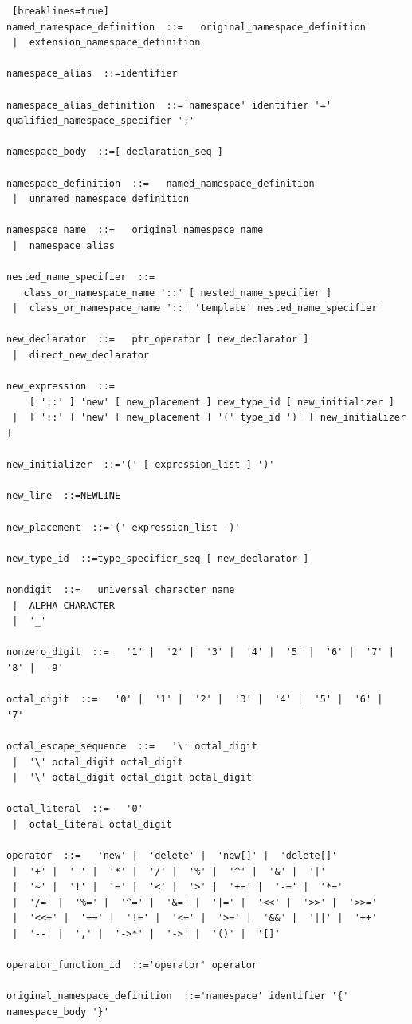 \documentclass[11pt]{book}
\begin{document}
\begin{lstlisting} [breaklines=true]
named_namespace_definition  ::=   original_namespace_definition
 |  extension_namespace_definition

namespace_alias  ::=identifier

namespace_alias_definition  ::='namespace' identifier '=' qualified_namespace_specifier ';'

namespace_body  ::=[ declaration_seq ]

namespace_definition  ::=   named_namespace_definition
 |  unnamed_namespace_definition

namespace_name  ::=   original_namespace_name
 |  namespace_alias

nested_name_specifier  ::=
   class_or_namespace_name '::' [ nested_name_specifier ]
 |  class_or_namespace_name '::' 'template' nested_name_specifier

new_declarator  ::=   ptr_operator [ new_declarator ]
 |  direct_new_declarator

new_expression  ::=
    [ '::' ] 'new' [ new_placement ] new_type_id [ new_initializer ]
 |  [ '::' ] 'new' [ new_placement ] '(' type_id ')' [ new_initializer ]

new_initializer  ::='(' [ expression_list ] ')'

new_line  ::=NEWLINE

new_placement  ::='(' expression_list ')'

new_type_id  ::=type_specifier_seq [ new_declarator ]

nondigit  ::=   universal_character_name
 |  ALPHA_CHARACTER
 |  '_'

nonzero_digit  ::=   '1' |  '2' |  '3' |  '4' |  '5' |  '6' |  '7' |  '8' |  '9'

octal_digit  ::=   '0' |  '1' |  '2' |  '3' |  '4' |  '5' |  '6' |  '7'
   
octal_escape_sequence  ::=   '\' octal_digit
 |  '\' octal_digit octal_digit
 |  '\' octal_digit octal_digit octal_digit

octal_literal  ::=   '0'
 |  octal_literal octal_digit

operator  ::=   'new' |  'delete' |  'new[]' |  'delete[]'
 |  '+' |  '-' |  '*' |  '/' |  '%' |  '^' |  '&' |  '|'
 |  '~' |  '!' |  '=' |  '<' |  '>' |  '+=' |  '-=' |  '*='
 |  '/=' |  '%=' |  '^=' |  '&=' |  '|=' |  '<<' |  '>>' |  '>>='
 |  '<<=' |  '==' |  '!=' |  '<=' |  '>=' |  '&&' |  '||' |  '++'
 |  '--' |  ',' |  '->*' |  '->' |  '()' |  '[]'

operator_function_id  ::='operator' operator

original_namespace_definition  ::='namespace' identifier '{' namespace_body '}'


\end{lstlisting}
\end{document}
